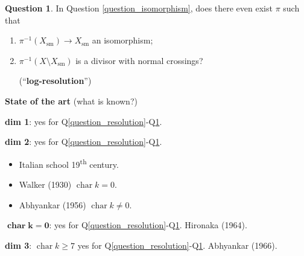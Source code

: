 \documentclass[12pt]{article}
\DeclareMathOperator{\chara}{char}
\theoremstyle{definition}
\newtheorem{question}{Question}
\begin{document}
\begin{question}\label{question_log-resolution}
In Question \ref{question_isomorphism}, does there even exist $\pi$ such that
\begin{enumerate}[label=\roman*)]
\item $\pi^{-1}(X_\text{sm})\rightarrow X_\text{sm}$ an isomorphism;
\item $\pi^{-1}(X\setminus X_\text{sm})$ is a divisor with normal crossings?

\begin{center}
\end{center}

(``\textbf{log-resolution}'')
\end{enumerate}
\end{question}

\textbf{State of the art} (what is known?)

\textbf{dim 1}: yes for Q\ref{question_resolution}-Q\ref{question_log-resolution}.

\textbf{dim 2}: yes for Q\ref{question_resolution}-Q\ref{question_log-resolution}.
\begin{itemize}[label=$-$]
\item Italian school 19\textsuperscript{th} century.
\item Walker (1930) $\chara k=0$.
\item Abhyankar (1956) $\chara k\neq0$.
\end{itemize}

$\boldsymbol{\chara k=0}$: yes for Q\ref{question_resolution}-Q\ref{question_log-resolution}. Hironaka (1964).

\textbf{dim 3}: $\chara k\geq7$ yes for Q\ref{question_resolution}-Q\ref{question_log-resolution}. Abhyankar (1966).
\end{document}
